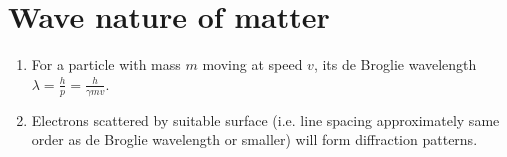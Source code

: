 \section{Wave nature of matter}
\begin{enumerate}
    \item For a particle with mass \(m\) moving at speed \(v\), its de Broglie wavelength \(\lambda = \frac{h}{p} = \frac{h}{\gamma mv}\).
    \item Electrons scattered by suitable surface (i.e. line spacing approximately same order as de Broglie wavelength or smaller) will form diffraction patterns.
\end{enumerate}

